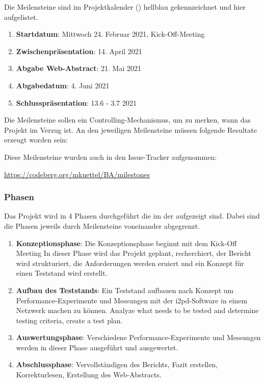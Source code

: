 Die Meilensteine sind im Projektkalender () hellblau gekennzeichnet und hier aufgelistet.

\begin{enumerate}
    \item \textbf{Startdatum}: Mittwoch 24. Februar 2021, Kick-Off-Meeting
    \item \textbf{Zwischenpräsentation}: 14. April 2021
    \item \textbf{Abgabe Web-Abstract}: 21. Mai 2021
    \item \textbf{Abgabedatum}: 4. Juni 2021
    \item \textbf{Schlusspräsentation}: 13.6 - 3.7 2021
\end{enumerate}

Die Meilensteine sollen ein Controlling-Mechanismus, um zu merken, wann das Projekt im Verzug ist.
An den jeweiligen Meilensteine müssen folgende Resultate erzeugt worden sein:


Diese Meilensteine wurden auch in den Issue-Tracker aufgenommen:

\url{https://codeberg.org/mkuettel/BA/milestones}

\subsubsection{Phasen}
\label{sec:phasen}

Das Projekt wird in 4 Phasen durchgeführt die im der  aufgezeigt sind.
Dabei sind die Phasen jeweils durch Meilensteine voneinander abgegrenzt.

\begin{enumerate}
    \item \textbf{Konzeptionsphase}: Die Konzeptionsphase beginnt mit dem Kick-Off Meeting
        In dieser Phase wird das Projekt geplant, recherchiert, der Bericht wird strukturiert, die Anforderungen werden eruiert und  ein Konzept für einen Teststand wird erstellt.
    \item \textbf{Aufbau des Teststands}: Ein Teststand aufbauen nach Konzept um Performance-Experimente und Messungen mit der i2pd-Software in einem Netzwerk machen zu können.
Analyze what needs to be tested and determine testing criteria, create a test plan.
    \item \textbf{Auswertungsphase}: Verschiedene Performance-Experimente und Messungen werden in dieser Phase ausgeführt und ausgewertet.
    \item \textbf{Abschlussphase}: Vervollständigen des Berichts, Fazit erstellen, Korrekturlesen, Erstellung des Web-Abstracts.
\end{enumerate}


